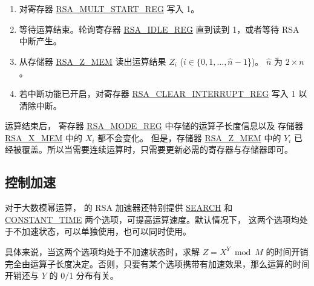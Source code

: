\documentclass[main\_\_CN.tex]{subfiles}
\begin{document}
\begin{enumerate}
        只需要根据运算子长度，将这两个运算子中有效的数据写入存储器，没有使用到的存储器可以是任意值。

    \item 对寄存器 \hyperref[regdesc:RSAMULTSTARTREG]{RSA\_MULT\_START\_REG} 写入 1。

    \item 等待运算结束。轮询寄存器 \hyperref[regdesc:RSAIDLEREG]{RSA\_IDLE\_REG} 直到读到 1，或者等待 RSA 中断产生。

    \item 从存储器 \hyperref[regdesc:RSAmemory]{RSA\_Z\_MEM} 读出运算结果 \begin{math}Z_{i}\end{math} (\begin{math}i \in \{ 0, 1, \dots, \hat{n}-1 \end{math}\})。
        \begin{math}\hat{n}\end{math} 为  \begin{math} 2 \times n \end{math} 。

    \item 若中断功能已开启，对寄存器 \hyperref[regdesc:RSACLEARINTERRUPTREG]{RSA\_CLEAR\_INTERRUPT\_REG} 写入 1 以清除中断。

\end{enumerate}

运算结束后，
寄存器 \hyperref[regdesc:RSAMODEXPMODEREG]{RSA\_MODE\_REG} 中存储的运算子长度信息以及
存储器 \hyperref[regdesc:RSAmemory]{RSA\_X\_MEM} 中的 \begin{math}{X}_{i}\end{math} 都不会变化。
但是，存储器 \hyperref[regdesc:RSAmemory]{RSA\_Z\_MEM} 中的 \begin{math}{Y}_{i}\end{math}
已经被覆盖。所以当需要连续运算时，只需要更新必需的寄存器与存储器即可。

\subsection{控制加速}\label{sec:Accelerate options}

对于大数模幂运算，\chipname{} 的 RSA 加速器还特别提供 \hyperref[regdesc:RSASEARCHENABLEREG]{SEARCH} 和 \hyperref[regdesc:RSACONSTANTTIMEREG]{CONSTANT\_TIME} 两个选项，可提高运算速度。默认情况下， 这两个选项均处于不加速状态，可以单独使用，也可以同时使用。

具体来说，当这两个选项均处于不加速状态时，求解 \begin{math}Z = X^{Y} \bmod M\end{math} 的时间开销完全由运算子长度决定。否则，只要有某个选项携带有加速效果，那么运算的时间开销还与 \begin{math}Y\end{math} 的 0/1 分布有关。
\end{document}
